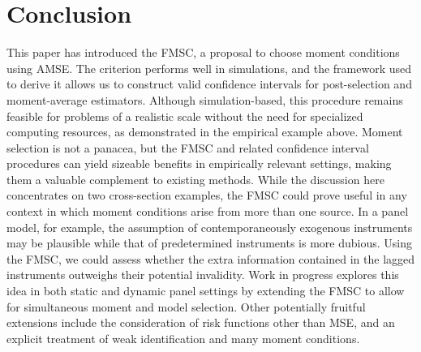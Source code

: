 \section{Conclusion}
\label{sec:conclude}
This paper has introduced the FMSC, a proposal to choose moment conditions using AMSE. 
The criterion performs well in simulations, and the framework used to derive it allows us to construct valid confidence intervals for post-selection and moment-average estimators.  
Although simulation-based, this procedure remains feasible for problems of a realistic scale without the need for specialized computing resources, as demonstrated in the empirical example above.
Moment selection is not a panacea, but the FMSC and related confidence interval procedures can yield sizeable benefits in empirically relevant settings, making them a valuable complement to existing methods.
While the discussion here concentrates on two cross-section examples, the FMSC could prove useful in any context in which moment conditions arise from more than one source. 
In a panel model, for example, the assumption of contemporaneously exogenous instruments may be plausible while that of predetermined instruments is more dubious.
Using the FMSC, we could assess whether the extra information contained in the lagged instruments outweighs their potential invalidity. 
Work in progress explores this idea in both static and dynamic panel settings by extending the FMSC to allow for simultaneous moment and model selection.
Other potentially fruitful extensions include the consideration of risk functions other than MSE, and an explicit treatment of weak identification and many moment conditions.
